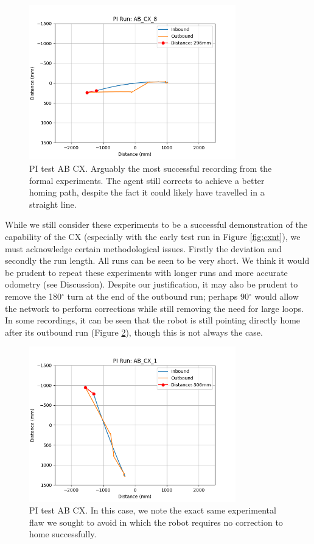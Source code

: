 \documentclass[a4paper,11pt,twoside,openright]{article}
\begin{document}
\begin{figure}[h!]
  \centering
  \includegraphics[width=0.8\textwidth]{AB_CX_8}
  \caption{\label{fig:abcx8i} PI test AB\textunderscore
    CX. Arguably the most successful recording from
    the formal experiments. The agent still corrects to achieve a
    better homing path, despite the fact it could likely have
    travelled in a straight line. }
\end{figure}

While we still consider these experiments to be a successful
demonstration of the capability of the CX (especially with the early
test run in Figure \ref{fig:cxnt}), we must acknowledge certain
methodological issues. Firstly the deviation and secondly the run
length. All runs can be seen to be very short. We think it would be
prudent to repeat these experiments with longer runs and more accurate
odometry (see Discussion). Despite our justification, it may also be
prudent to remove the 180$^{\circ}$ turn at the end of the outbound
run; perhaps 90$^\circ$ would allow the network to perform corrections
while still removing the need for large loops. In some recordings, it
can be seen that the robot is still pointing directly home after its
outbound run (Figure \ref{fig:abcx1i}), though this is not always the
case.

\begin{figure}[h!]
  \centering
  \includegraphics[width=0.8\textwidth]{AB_CX_1}
  \caption{\label{fig:abcx1i} PI test AB\textunderscore
    CX. In this case, we note the exact same
    experimental flaw we sought to avoid in which the robot requires
    no correction to home successfully.}
\end{figure}
\end{document}
